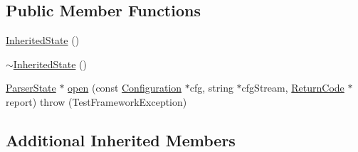 \subsection*{Public Member Functions}
\begin{DoxyCompactItemize}
\item 
\hyperlink{classit_1_1testbench_1_1parser_1_1InheritedState_a5e9c11fc7bb01659bdeb72cd6f0f8d5b}{Inherited\-State} ()
\item 
\hyperlink{classit_1_1testbench_1_1parser_1_1InheritedState_aad92b0488889d46deb6dde70156ce552}{$\sim$\-Inherited\-State} ()
\item 
\hyperlink{classit_1_1testbench_1_1parser_1_1ParserState}{Parser\-State} $\ast$ \hyperlink{classit_1_1testbench_1_1parser_1_1InheritedState_a661d01741575c4f2eeee66ffe3211ab5}{open} (const \hyperlink{structit_1_1testbench_1_1data_1_1Configuration}{Configuration} $\ast$cfg, string $\ast$cfg\-Stream, \hyperlink{structit_1_1testbench_1_1data_1_1ReturnCode}{Return\-Code} $\ast$report)  throw (\-Test\-Framework\-Exception)
\end{DoxyCompactItemize}
\subsection*{Additional Inherited Members}


